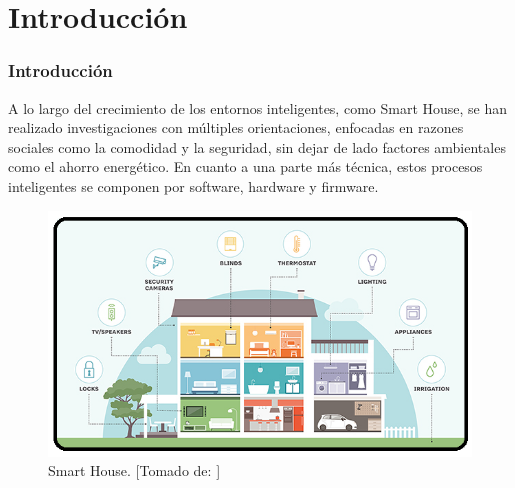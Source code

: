 \section{Introducción}
\begin{frame}
\frametitle{Introducción}
\footnotesize
 A lo largo del crecimiento de los entornos inteligentes, como Smart House, se han realizado investigaciones con múltiples orientaciones, enfocadas en razones sociales como la comodidad y la seguridad, sin dejar de lado factores ambientales como el ahorro energético. En cuanto a una parte más técnica, estos procesos inteligentes se componen por software, hardware y firmware.\newline
 
 \begin{figure}[!]
 	\centering
 	\caption{Smart House. [Tomado de: \cite{SHi}]}
 	\label{fig:intr}
 	\includegraphics[width=0.4\linewidth]{Imagenes/intro}
 \end{figure}
\end{frame}